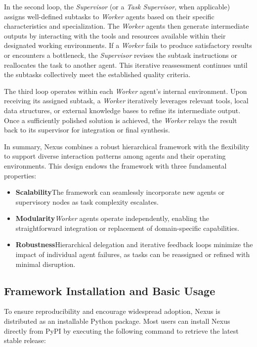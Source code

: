 \underline{}
In the second loop, the {\em Supervisor} (or a {\em Task Supervisor}, when applicable) assigns well-defined subtasks to {\em Worker} agents based on their specific characteristics and specialization. The {\em Worker} agents then generate intermediate outputs by interacting with the tools and resources available within their designated working environments. If a {\em Worker} fails to produce satisfactory results or encounters a bottleneck, the {\em Supervisor} revises the subtask instructions or reallocates the task to another agent. This iterative reassessment continues until the subtasks collectively meet the established quality criteria.

\underline{}
The third loop operates within each {\em Worker} agent's internal environment. Upon receiving its assigned subtask, a {\em Worker} iteratively leverages relevant tools, local data structures, or external knowledge bases to refine its intermediate output. Once a sufficiently polished solution is achieved, the {\em Worker} relays the result back to its supervisor for integration or final synthesis.

In summary, Nexus combines a robust hierarchical framework with the flexibility to support diverse interaction patterns among agents and their operating environments. This design endows the framework with three fundamental properties:

\begin{itemize}
\item \textbf{Scalability\textemdash}The framework can seamlessly incorporate new agents or supervisory nodes as task complexity escalates.
\item \textbf{Modularity\textemdash}{\em Worker} agents operate independently, enabling the straightforward integration or replacement of domain-specific capabilities.
\item \textbf{Robustness\textemdash}Hierarchical delegation and iterative feedback loops minimize the impact of individual agent failures, as tasks can be reassigned or refined with minimal disruption.
\end{itemize}

\subsection{Framework Installation and Basic Usage}

To ensure reproducibility and encourage widespread adoption, Nexus is distributed as an installable Python package. Most users can install Nexus directly from PyPI by executing the following command to retrieve the latest stable release:

